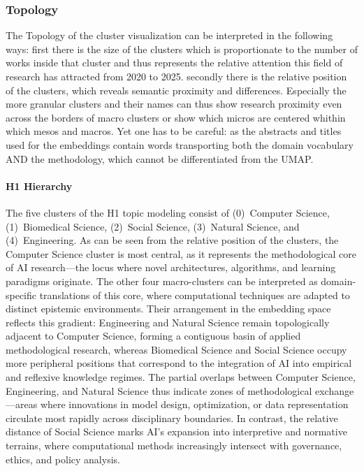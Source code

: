 \documentclass{article}
\begin{document}
\subsubsection{Topology}

The Topology of the cluster visualization can be interpreted in the following ways: first there is the size of the clusters which is proportionate to the number of works inside that cluster and thus represents the relative attention this field of research has attracted from 2020 to 2025. secondly there is the relative position of the clusters, which reveals semantic proximity and differences. Especially the more granular clusters and their names can thus show research proximity even across the borders of macro clusters or show which micros are centered whithin which mesos and macros. Yet one has to be careful: as the abstracts and titles used for the embeddings contain words transporting both the domain vocabulary AND the methodology, which cannot be differentiated from the UMAP. 


\paragraph{H1 Hierarchy}
The five clusters of the H1 topic modeling consist of (0)~Computer Science, (1)~Biomedical Science, (2)~Social Science, (3)~Natural Science, and (4)~Engineering. As can be seen from the relative position of the clusters, the Computer Science cluster is most central, as it represents the methodological core of AI research—the locus where novel architectures, algorithms, and learning paradigms originate. The other four macro-clusters can be interpreted as domain-specific translations of this core, where computational techniques are adapted to distinct epistemic environments. Their arrangement in the embedding space reflects this gradient: Engineering and Natural Science remain topologically adjacent to Computer Science, forming a contiguous basin of applied methodological research, whereas Biomedical Science and Social Science occupy more peripheral positions that correspond to the integration of AI into empirical and reflexive knowledge regimes. The partial overlaps between Computer Science, Engineering, and Natural Science thus indicate zones of methodological exchange—areas where innovations in model design, optimization, or data representation circulate most rapidly across disciplinary boundaries. In contrast, the relative distance of Social Science marks AI’s expansion into interpretive and normative terrains, where computational methods increasingly intersect with governance, ethics, and policy analysis.
\end{document}
